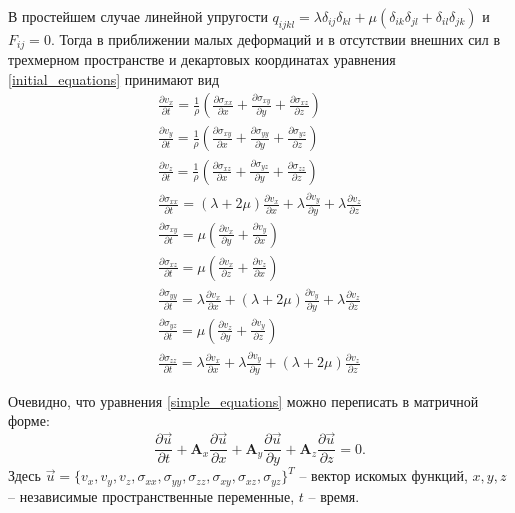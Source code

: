 В простейшем случае линейной упругости $q_{ijkl}=\lambda\delta_{ij}\delta_{kl}+\mu(\delta_{ik}\delta_{jl}+\delta_{il}\delta_{jk})$ и $F_{ij}=0$. Тогда в приближении малых деформаций и в отсутствии внешних сил в трехмерном пространстве и декартовых координатах уравнения \ref{initial_equations} принимают вид
\begin{eqnarray}
\label{simple_equations}
\frac{\partial{v_x}}{\partial{t}}=\frac{1}{\rho}(\frac{\partial{\sigma_{xx}}}{\partial{x}}+\frac{\partial{\sigma_{xy}}}{\partial{y}}+\frac{\partial{\sigma_{xz}}}{\partial{z}})
\nonumber\\
\frac{\partial{v_y}}{\partial{t}}=\frac{1}{\rho}(\frac{\partial{\sigma_{xy}}}{\partial{x}}+\frac{\partial{\sigma_{yy}}}{\partial{y}}+\frac{\partial{\sigma_{yz}}}{\partial{z}})
\nonumber\\
\frac{\partial{v_z}}{\partial{t}}=\frac{1}{\rho}(\frac{\partial{\sigma_{xz}}}{\partial{x}}+\frac{\partial{\sigma_{yz}}}{\partial{y}}+\frac{\partial{\sigma_{zz}}}{\partial{z}})
\nonumber\\
\frac{\partial{\sigma_{xx}}}{\partial{t}}=(\lambda+2\mu)\frac{\partial{v_x}}{\partial{x}}+\lambda\frac{\partial{v_y}}{\partial{y}}+\lambda\frac{\partial{v_z}}{\partial{z}}
\nonumber\\
\frac{\partial{\sigma_{xy}}}{\partial{t}}=\mu(\frac{\partial{v_x}}{\partial{y}}+\frac{\partial{v_y}}{\partial{x}})
\nonumber\\
\frac{\partial{\sigma_{xz}}}{\partial{t}}=\mu(\frac{\partial{v_x}}{\partial{z}}+\frac{\partial{v_z}}{\partial{x}})
\nonumber\\
\frac{\partial{\sigma_{yy}}}{\partial{t}}=\lambda\frac{\partial{v_x}}{\partial{x}}+(\lambda+2\mu)\frac{\partial{v_y}}{\partial{y}}+\lambda\frac{\partial{v_z}}{\partial{z}}
\nonumber\\
\frac{\partial{\sigma_{yz}}}{\partial{t}}=\mu(\frac{\partial{v_z}}{\partial{y}}+\frac{\partial{v_y}}{\partial{z}})
\nonumber\\
\frac{\partial{\sigma_{zz}}}{\partial{t}}=\lambda\frac{\partial{v_x}}{\partial{x}}+\lambda\frac{\partial{v_y}}{\partial{y}}+(\lambda+2\mu)\frac{\partial{v_z}}{\partial{z}}
\end{eqnarray}

Очевидно, что уравнения \ref{simple_equations} можно переписать в матричной форме:
\begin{equation}
\label{simple_matrix_equation}
\frac{\partial\vec{u}}{\partial{t}}+\mathbf{A}_x\frac{\partial\vec{u}}{\partial{x}}+
\mathbf{A}_y\frac{\partial\vec{u}}{\partial{y}}+
\mathbf{A}_z\frac{\partial\vec{u}}{\partial{z}}=0.
\end{equation}
Здесь
$\vec{u}=\{v_x,v_y,v_z,\sigma_{xx},\sigma_{yy},\sigma_{zz},\sigma_{xy},\sigma_{xz},\sigma_{yz}\}^T$
-- вектор искомых функций, $x,y,z$ --  независимые пространственные переменные, $t$ -- время.

